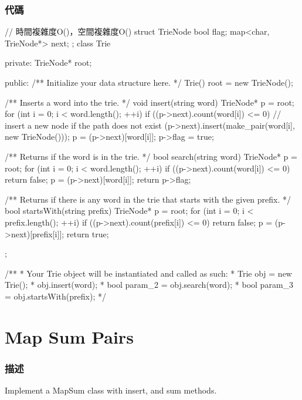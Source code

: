 \subsubsection{代碼}
\begin{Code}
// 時間複雜度O()，空間複雜度O()
struct TrieNode {
    bool flag;
    map<char, TrieNode*> next;
};
class Trie {
private:
    TrieNode* root;

public:
    /** Initialize your data structure here. */
    Trie() {
        root = new TrieNode();
    }

    /** Inserts a word into the trie. */
    void insert(string word) {
        TrieNode* p = root;
        for (int i = 0; i < word.length(); ++i) {
            if ((p->next).count(word[i]) <= 0) {
                // insert a new node if the path does not exist
                (p->next).insert(make_pair(word[i], new TrieNode()));
            }
            p = (p->next)[word[i]];
        }
        p->flag = true;
    }

    /** Returns if the word is in the trie. */
    bool search(string word) {
        TrieNode* p = root;
        for (int i = 0; i < word.length(); ++i) {
            if ((p->next).count(word[i]) <= 0) {
                return false;
            }
            p = (p->next)[word[i]];
        }
        return p->flag;
    }

    /** Returns if there is any word in the trie that starts with the given prefix. */
    bool startsWith(string prefix) {
        TrieNode* p = root;
        for (int i = 0; i < prefix.length(); ++i) {
            if ((p->next).count(prefix[i]) <= 0) {
                return false;
            }
            p = (p->next)[prefix[i]];
        }
        return true;
    }
};

/**
 * Your Trie object will be instantiated and called as such:
 * Trie obj = new Trie();
 * obj.insert(word);
 * bool param_2 = obj.search(word);
 * bool param_3 = obj.startsWith(prefix);
 */
\end{Code}

\section{Map Sum Pairs} %
\label{sec:map-sum-pairs}


\subsubsection{描述}
Implement a MapSum class with insert, and sum methods.

